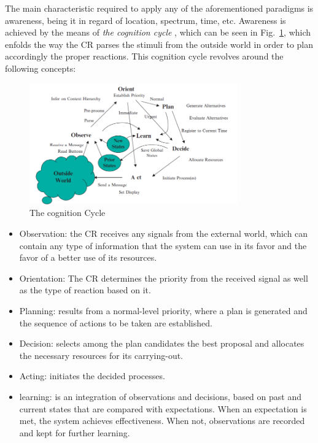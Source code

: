 The main characteristic required to apply any of the aforementioned paradigms is awareness, being it in regard of location, spectrum, time, etc. Awareness is achieved by the means of \emph{the cognition cycle} \cite{mitola1999}, which can be seen in Fig.~\ref{fig:cognition_cycle}, which enfolds the way the \ac{CR} parses the stimuli from the outside world in order to plan accordingly the proper reactions. This cognition cycle revolves around the following concepts:

\begin{figure}[htb]
    \centering
      \includegraphics[width=0.8\textwidth]{figures/cognition_cycle.png}
      \caption{The cognition Cycle\cite{mitola1999}}
      \label{fig:cognition_cycle}
\end{figure}

\begin{itemize}
    \item Observation: the \ac{CR} receives any signals from the external world, which can contain any type of information that the system can use in its favor and the favor of a better use of its resources.
    \item Orientation: The \ac{CR} determines the priority from the received signal as well as the type of reaction based on it.
    \item Planning: results from a normal-level priority, where a plan is generated and the sequence of actions to be taken are established.
    \item Decision: selects among the plan candidates the best proposal and allocates the necessary resources for its carrying-out.
    \item Acting: initiates the decided processes.
    \item learning: is an integration of observations and decisions, based on past and current states that are compared with expectations. When an expectation is met, the system achieves effectiveness. When not, observations are recorded and kept for further learning.
\end{itemize}

